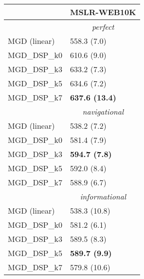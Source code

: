 \begin{tabular*}{\textwidth}{@{\extracolsep{\fill} } l  l  }
\toprule
 & { \small \textbf{MSLR-WEB10K}} \\
\midrule
& \multicolumn{1}{|c|}{\textit{perfect}} \\
\midrule
MGD (linear) & 558.3 {\tiny (7.0)} \\
MGD\_DSP\_k0 & 610.6 {\tiny (9.0)} \\
MGD\_DSP\_k3 & 633.2 {\tiny (7.3)} \\
MGD\_DSP\_k5 & 634.6 {\tiny (7.2)} \\
MGD\_DSP\_k7 & \bf 637.6 {\tiny (13.4)} \\
\midrule
& \multicolumn{1}{|c|}{\textit{navigational}} \\
\midrule
MGD (linear) & 538.2 {\tiny (7.2)} \\
MGD\_DSP\_k0 & 581.4 {\tiny (7.9)} \\
MGD\_DSP\_k3 & \bf 594.7 {\tiny (7.8)} \\
MGD\_DSP\_k5 & 592.0 {\tiny (8.4)} \\
MGD\_DSP\_k7 & 588.9 {\tiny (6.7)} \\
\midrule
& \multicolumn{1}{|c|}{\textit{informational}} \\
\midrule
MGD (linear) & 538.3 {\tiny (10.8)} \\
MGD\_DSP\_k0 & 581.2 {\tiny (6.1)} \\
MGD\_DSP\_k3 & 589.5 {\tiny (8.3)} \\
MGD\_DSP\_k5 & \bf 589.7 {\tiny (9.9)} \\
MGD\_DSP\_k7 & 579.8 {\tiny (10.6)} \\
\bottomrule
\end{tabular*}
